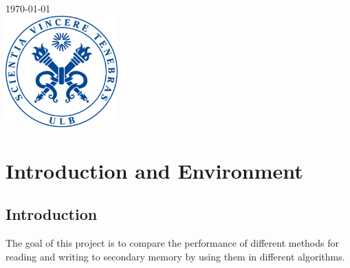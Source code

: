 \documentclass[12pt]{article}
\begin{document}
\begin{titlepage}


{\large \today}\\[1cm] %


\includegraphics[width=4.3cm, height=4.3cm]{sceau-a-quadri.jpg}\\%
 

\vfill %

\end{titlepage}

\tableofcontents
\newpage

\section{Introduction and Environment}
\subsection{Introduction}
The goal of this project is to compare the performance of different methods for reading and writing to secondary memory by using them in different algorithms.\\
\end{document}
